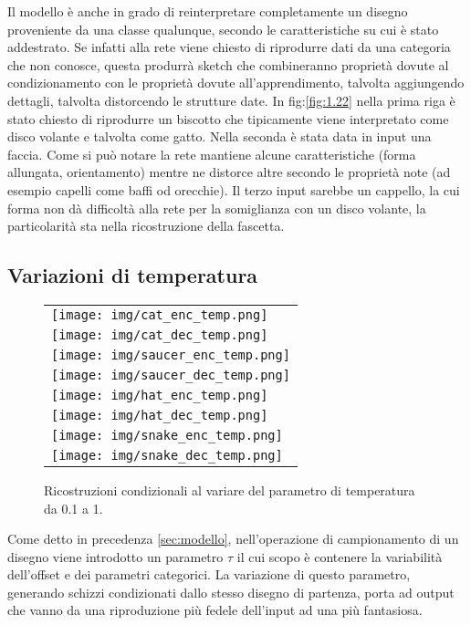 Il modello è anche in grado di reinterpretare completamente un disegno proveniente da una classe qualunque, secondo le caratteristiche su cui è stato addestrato. Se infatti alla rete viene chiesto di riprodurre dati da una categoria che non conosce, questa produrrà sketch che combineranno proprietà dovute al condizionamento con le proprietà dovute all'apprendimento, talvolta aggiungendo dettagli, talvolta distorcendo le strutture date. In fig:\ref{fig:1.22} nella prima riga è stato chiesto di riprodurre un biscotto che tipicamente viene interpretato come disco volante e talvolta come gatto. Nella seconda è stata data in input una faccia. Come si può notare la rete mantiene alcune caratteristiche (forma allungata, orientamento) mentre ne distorce altre secondo le proprietà note (ad esempio capelli come baffi od orecchie). Il terzo input sarebbe un cappello, la cui forma non dà difficoltà alla rete per la somiglianza con un disco volante, la particolarità sta nella ricostruzione della fascetta.

\subsection{Variazioni di temperatura} %
\label{sub:variazioni_di_temperatura}
\begin{figure}[ht]
	\centering
	\begin{tabular}{l}
		\texttt{[image: img/cat\_enc\_temp.png]} \\
		\texttt{[image: img/cat\_dec\_temp.png]} \\
		\texttt{[image: img/saucer\_enc\_temp.png]} \\
		\texttt{[image: img/saucer\_dec\_temp.png]} \\
		\texttt{[image: img/hat\_enc\_temp.png]} \\
		\texttt{[image: img/hat\_dec\_temp.png]} \\
		\texttt{[image: img/snake\_enc\_temp.png]} \\
		\texttt{[image: img/snake\_dec\_temp.png]}
	\end{tabular}
	\caption{Ricostruzioni condizionali al variare del parametro di temperatura da 0.1 a 1.}
	\label{fig:1.24}
\end{figure}

Come detto in precedenza \ref{sec:modello}, nell'operazione di campionamento di un disegno viene introdotto un parametro $\tau$ il cui scopo è contenere la variabilità dell'offset e dei parametri categorici. La variazione di questo parametro, generando schizzi condizionati dallo stesso disegno di partenza, porta ad output che vanno da una riproduzione più fedele dell'input ad una più fantasiosa.

